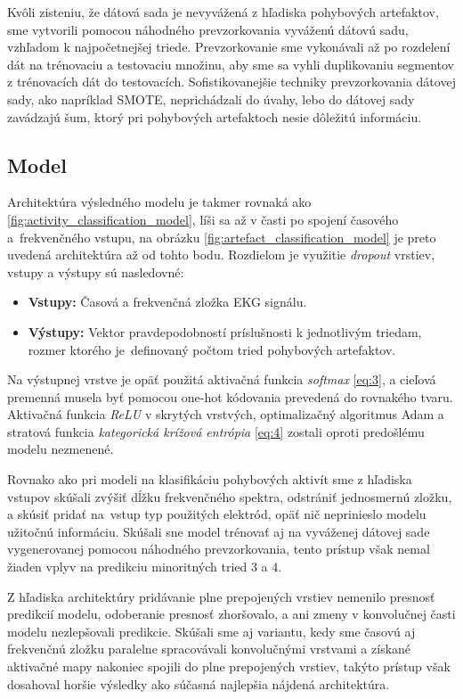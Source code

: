 Kvôli zisteniu, že dátová sada je nevyvážená z hľadiska pohybových artefaktov, sme vytvorili pomocou náhodného prevzorkovania vyváženú dátovú sadu, vzhľadom k najpočetnejšej triede. Prevzorkovanie sme vykonávali až po rozdelení dát na trénovaciu a testovaciu množinu, aby sme sa vyhli duplikovaniu segmentov z trénovacích dát do testovacích. Sofistikovanejšie techniky prevzorkovania dátovej sady, ako napríklad SMOTE, neprichádzali do úvahy, lebo do dátovej sady zavádzajú šum, ktorý pri pohybových artefaktoch nesie dôležitú informáciu.

\subsection{Model}

Architektúra výsledného modelu je takmer rovnaká ako \ref{fig:activity_classification_model}, líši sa až v časti po spojení časového a~frekvenčného vstupu, na obrázku \ref{fig:artefact_classification_model} je preto uvedená architektúra až od tohto bodu. Rozdielom je využitie \textit{dropout} vrstiev, vstupy a výstupy sú nasledovné:
\begin{itemize}
    \item \textbf{Vstupy:} Časová a frekvenčná zložka EKG signálu.
    \item \textbf{Výstupy:} Vektor pravdepodobností príslušnosti k jednotlivým triedam, rozmer ktorého je~definovaný počtom tried pohybových artefaktov.
\end{itemize}

Na výstupnej vrstve je opäť použitá aktivačná funkcia \textit{softmax} \ref{eq:3}, a cieľová premenná musela byť pomocou one-hot kódovania prevedená do rovnakého tvaru. Aktivačná funkcia \textit{ReLU} v skrytých vrstvých, optimalizačný algoritmus Adam a stratová funkcia \textit{kategorická krížová entrópia} \ref{eq:4} zostali oproti predošlému modelu nezmenené.

Rovnako ako pri modeli na klasifikáciu pohybových aktivít sme z hľadiska vstupov skúšali zvýšiť dĺžku frekvenčného spektra, odstrániť jednosmernú zložku, a skúsiť pridať na~vstup typ použitých elektród, opäť nič neprinieslo modelu užitočnú informáciu. Skúšali sne model trénovať aj na vyváženej dátovej sade vygenerovanej pomocou náhodného prevzorkovania, tento prístup však nemal žiaden vplyv na predikciu minoritných tried 3 a 4.

Z hľadiska architektúry pridávanie plne prepojených vrstiev nemenilo presnosť predikcií modelu, odoberanie presnosť zhoršovalo, a ani zmeny v konvolučnej časti modelu nezlepšovali predikcie. Skúšali sme aj variantu, kedy sme časovú aj frekvenčnú zložku paralelne spracovávali konvolučnými vrstvami a získané aktivačné mapy nakoniec spojili do plne prepojených vrstiev, takýto prístup však dosahoval horšie výsledky ako súčasná najlepšia nájdená architektúra.

